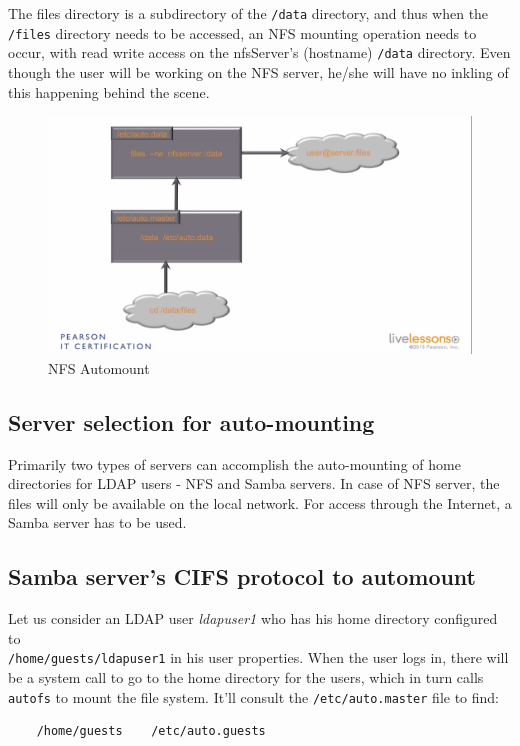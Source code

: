 \documentclass{report}
\begin{document}
	The files directory is a subdirectory of the \verb|/data| directory, and thus when the \verb|/files| directory needs to be accessed, an NFS mounting operation needs to occur, with read write access on the nfsServer's (hostname) \verb|/data| directory. Even though the user will be working on the NFS server, he/she will have no inkling of this happening behind the scene. 
	
	\begin{figure}[H]
		\centering
		\includegraphics[width=0.9\linewidth]{"1.7.a NFS Automount"}
		\caption{NFS Automount}
		\label{fig:1}
	\end{figure}
	
	
	\subsection{Server selection for auto-mounting}
	Primarily two types of servers can accomplish the auto-mounting of home directories for LDAP users - NFS and Samba servers. In case of NFS server, the files will only be available on the local network. For access through the Internet, a Samba server has to be used. 
	
	\subsection{Samba server's CIFS protocol to automount}
	Let us consider an LDAP user \textit{ldapuser1} who has his home directory configured to \\\verb|/home/guests/ldapuser1| in his user properties. When the user logs in, there will be a system call to go to the home directory for the users, which in turn calls \verb|autofs| to mount the file system. It'll consult the \verb|/etc/auto.master| file to find:
	
	\begin{verbatim}
	/home/guests	/etc/auto.guests
	\end{verbatim}
	
\end{document}
